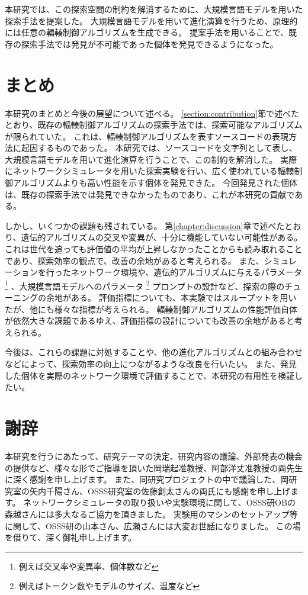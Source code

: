 \documentclass[a4paper,11pt]{jreport}
\newcommand{\chapref}[1]{第\ref{#1}章}
\newcommand{\secref}[1]{\ref{#1}節}
\begin{document}
本研究では、この探索空間の制約を解消するために、大規模言語モデルを用いた探索手法を提案した。
大規模言語モデルを用いて進化演算を行うため、原理的には任意の輻輳制御アルゴリズムを生成できる。
提案手法を用いることで、既存の探索手法では発見が不可能であった個体を発見できるようになった。

\newpage

\chapter{まとめ}

本研究のまとめと今後の展望について述べる。
\secref{section:contribution}で述べたとおり、既存の輻輳制御アルゴリズムの探索手法では、探索可能なアルゴリズムが限られていた。
これは、輻輳制御アルゴリズムを表すソースコードの表現方法に起因するものであった。
本研究では、ソースコードを文字列として表し、大規模言語モデルを用いて進化演算を行うことで、この制約を解消した。
実際にネットワークシミュレータを用いた探索実験を行い、広く使われている輻輳制御アルゴリズムよりも高い性能を示す個体を発見できた。
今回発見された個体は、既存の探索手法では発見できなかったものであり、これが本研究の貢献である。

しかし、いくつかの課題も残されている。
\chapref{chapter:discussion}で述べたとおり、遺伝的アルゴリズムの交叉や変異が、十分に機能していない可能性がある。
これは世代を追っても評価値の平均が上昇しなかったことからも読み取れることであり、探索効率の観点で、改善の余地があると考えられる。
また、シミュレーションを行ったネットワーク環境や、遺伝的アルゴリズムに与えるパラメータ
\footnote{例えば交叉率や変異率、個体数など}
、大規模言語モデルへのパラメータ
\footnote{例えばトークン数やモデルのサイズ、温度など}
プロンプトの設計など、探索の際のチューニングの余地がある。
評価指標についても、本実験ではスループットを用いたが、他にも様々な指標が考えられる。
輻輳制御アルゴリズムの性能評価自体が依然大きな課題であるゆえ、評価指標の設計についても改善の余地があると考えられる。

今後は、これらの課題に対処することや、他の進化アルゴリズムとの組み合わせなどによって、探索効率の向上につながるような改良を行いたい。
また、発見した個体を実際のネットワーク環境で評価することで、本研究の有用性を検証したい。

\chapter*{謝辞}

本研究を行うにあたって、研究テーマの決定、研究内容の議論、外部発表の機会の提供など、様々な形でご指導を頂いた岡瑞起准教授、阿部洋丈准教授の両先生に深く感謝を申し上げます。
また、同研究プロジェクトの中で議論した、岡研究室の矢内千陽さん、OSSS研究室の佐藤創太さんの両氏にも感謝を申し上げます。
ネットワークシミュレータの取り扱いや実験環境に関して、OSSS研OBの森越さんには多大なるご協力を頂きました。
実験用のマシンのセットアップ等に関して、OSSS研の山本さん、広瀬さんには大変お世話になりました。
この場を借りて、深く御礼申し上げます。
\end{document}

